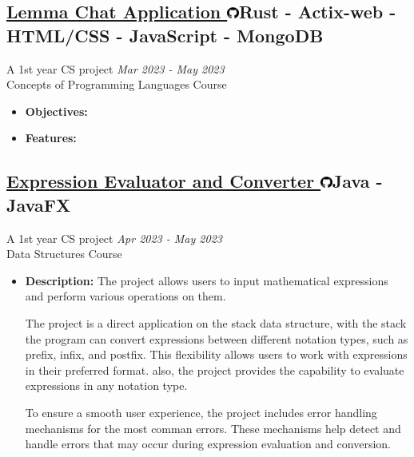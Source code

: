 \documentclass[a4paper,12pt]{article}
\newcommand{\projectTitle}[3]{%
    \subsection{\href{#2}{#1 \includegraphics[height=11pt]{images/github-logo.png}}\textmd{\hfill \normalsize{#3}}}
}
\begin{document}
		\projectTitle{Lemma Chat Application}{https://github.com/OmarMGaber/Lemma-Chat-App}{Rust - Actix-web - \small{HTML/CSS} - JavaScript - MongoDB}
			\vspace{-3mm}
			A 1st year CS project \hfill \small\textit{Mar 2023 - May 2023}\\
			Concepts of Programming Languages Course
			\begin{itemize}
				\item{\textbf{Objectives: } }
				\item{
					\textbf{Features: }
				}
			\end{itemize}
		
		\projectTitle{Expression Evaluator and Converter}{https://github.com/OmarMGaber/Turing-Machine-Simulator}{Java - JavaFX}
			\vspace{-3mm}
			A 1st year CS project \hfill \small\textit{Apr 2023 - May 2023}\\
			Data Structures Course
			\begin{itemize}
				\item{\textbf{Description: }The project allows users to input mathematical expressions and perform various operations on them.

The project is a direct application on the stack data structure, with the stack the program can convert expressions between different notation types, such as prefix, infix, and postfix. This flexibility allows users to work with expressions in their preferred format.
also, the project provides the capability to evaluate expressions in any notation type.

To ensure a smooth user experience, the project includes error handling mechanisms for the most comman errors. These mechanisms help detect and handle errors that may occur during expression evaluation and conversion. }
			\end{itemize}	
\end{document}

